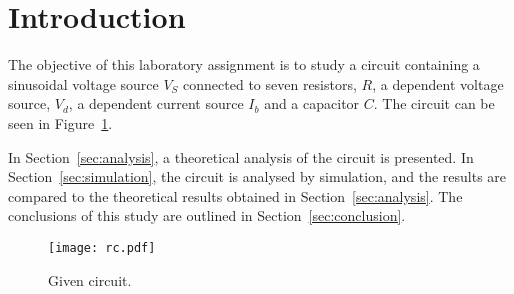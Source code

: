 \newpage

\section{Introduction}
\label{sec:introduction}

The objective of this laboratory assignment is to study a circuit containing a
sinusoidal voltage source $V_S$ connected to seven resistors, $R$, a dependent voltage source, $V_d$, a dependent current source $I_b$ and a capacitor $C$. The circuit can be seen in Figure~\ref{fig:rc}.


In Section~\ref{sec:analysis}, a theoretical analysis of the circuit is
presented. In Section~\ref{sec:simulation}, the circuit is analysed by
simulation, and the results are compared to the theoretical results obtained in
Section~\ref{sec:analysis}. The conclusions of this study are outlined in
Section~\ref{sec:conclusion}.

\begin{figure}[h] \centering
\texttt{[image: rc.pdf]}
\caption{Given circuit.}
\label{fig:rc}
\end{figure}


